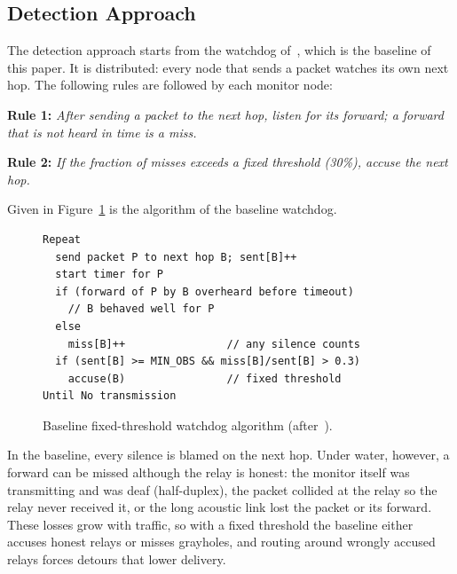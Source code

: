 \documentclass[conference]{IEEEtran}
\begin{document}
\subsection{Detection Approach}
The detection approach starts from the watchdog of~\cite{marti}, which is the baseline of this paper. It is distributed: every node that sends a packet watches its own next hop. The following rules are followed by each monitor node:

\textbf{Rule 1:} \emph{After sending a packet to the next hop, listen for its forward; a forward that is not heard in time is a miss.}

\textbf{Rule 2:} \emph{If the fraction of misses exceeds a fixed threshold (30\%), accuse the next hop.}

Given in Figure~\ref{fig:baseline} is the algorithm of the baseline watchdog.

\begin{figure}[t]
\begin{lstlisting}
Repeat
  send packet P to next hop B; sent[B]++
  start timer for P
  if (forward of P by B overheard before timeout)
    // B behaved well for P
  else
    miss[B]++                // any silence counts
  if (sent[B] >= MIN_OBS && miss[B]/sent[B] > 0.3)
    accuse(B)                // fixed threshold
Until No transmission
\end{lstlisting}
\caption{Baseline fixed-threshold watchdog algorithm (after~\cite{marti}).}\label{fig:baseline}
\end{figure}

In the baseline, every silence is blamed on the next hop. Under water, however, a forward can be missed although the relay is honest: the monitor itself was transmitting and was deaf (half-duplex), the packet collided at the relay so the relay never received it, or the long acoustic link lost the packet or its forward. These losses grow with traffic, so with a fixed threshold the baseline either accuses honest relays or misses grayholes, and routing around wrongly accused relays forces detours that lower delivery.
\end{document}
